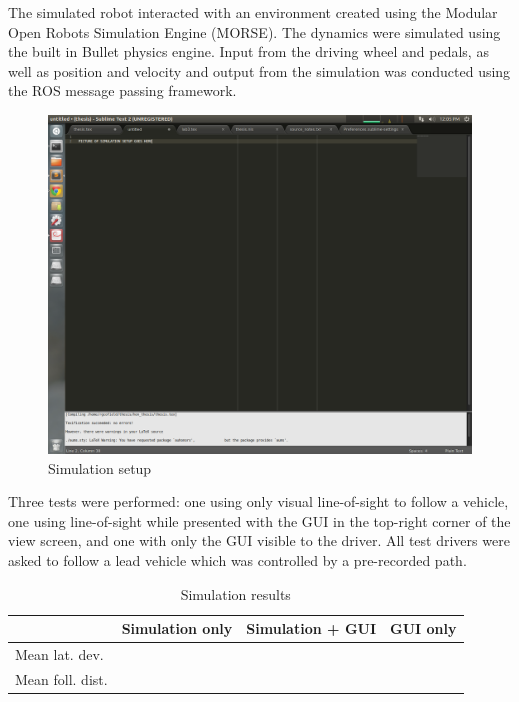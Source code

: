 \documentclass[12pt]{report}
\begin{document}
The simulated robot interacted with an environment created using the Modular Open Robots Simulation Engine (MORSE). The dynamics were simulated using the built in Bullet physics engine. Input from the driving wheel and pedals, as well as position and velocity and output from the simulation was conducted using the ROS message passing framework.

\begin{figure}[ht] \centering
    \includegraphics[width=6.5in]{./figs/sim_setup.png}
    \caption{Simulation setup}
    \label{fig:simsetup}
\end{figure}

Three tests were performed: one using only visual line-of-sight to follow a vehicle, one using line-of-sight while presented with the GUI in the top-right corner of the view screen, and one with only the GUI visible to the driver. All test drivers were asked to follow a lead vehicle which was controlled by a pre-recorded path.

\begin{table}[ht] \centering
    \label{tab:simexper}
    \caption{Simulation results}
    \begin{tabular}{l||c|c|c} \hline
                        &          \textbf{Simulation only}&    \textbf{Simulation + GUI}&       \textbf{GUI only}\\ \hline\hline
        Mean lat. dev.&          &                   &                       \\ \hline
        Mean foll. dist.&         &                   &                       \\ \hline

\end{tabular} \end{table}
\end{document}
